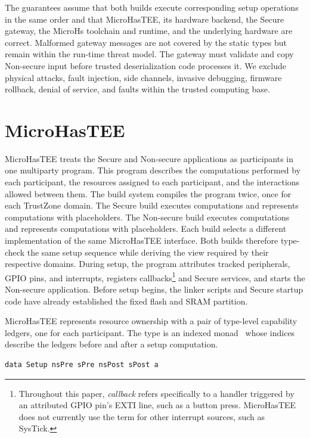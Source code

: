 \documentclass[sigconf]{acmart}
\begin{document}
The guarantees assume that both builds execute corresponding setup operations in the same order and that MicroHasTEE, its hardware backend, the Secure gateway, the MicroHs toolchain and runtime, and the underlying hardware are correct.
Malformed gateway messages are not covered by the static types but remain within the run-time threat model.
The gateway must validate and copy Non-secure input before trusted deserialization code processes it.
We exclude physical attacks, fault injection, side channels, invasive debugging, firmware rollback, denial of service, and faults within the trusted computing base.

\section{MicroHasTEE}

MicroHasTEE treats the Secure and Non-secure applications as participants in one multiparty program.
This program describes the computations performed by each participant, the resources assigned to each participant, and the interactions allowed between them.
The build system compiles the program twice, once for each TrustZone domain.
The Secure build executes  computations and represents  computations with placeholders.
The Non-secure build executes  computations and represents  computations with placeholders.
Each build selects a different implementation of the same MicroHasTEE interface.
Both builds therefore type-check the same setup sequence while deriving the view required by their respective domains.
During setup, the program attributes tracked peripherals, GPIO pins, and interrupts, registers callbacks\footnote{Throughout this paper, \textit{callback} refers specifically to a handler triggered by an attributed GPIO pin's EXTI line, such as a button press. MicroHasTEE does not currently use the term for other interrupt sources, such as SysTick.} and Secure services, and starts the Non-secure application.
Before setup begins, the linker scripts and Secure startup code have already established the fixed flash and SRAM partition.

MicroHasTEE represents resource ownership with a pair of type-level capability ledgers, one for each participant.
The  type is an indexed monad~\cite{DBLP:journals/jfp/Atkey09} whose indices describe the ledgers before and after a setup computation.

\begin{lstlisting}[style=haskell]
  data Setup nsPre sPre nsPost sPost a
\end{lstlisting}
\end{document}
